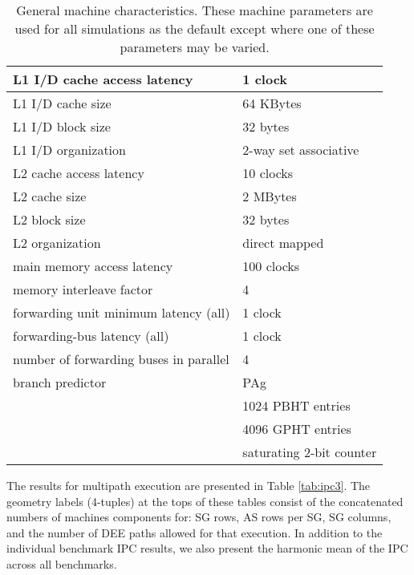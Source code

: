 \documentclass[10pt,twocolumn,dvips]{article}
\begin{document}
\begin{table*}
\scriptsize{
\begin{center}
\caption{General machine characteristics.
These machine parameters are used for all simulations as
the default except where one of these parameters may be varied.}
\label{tab:params}
\begin{tabular}{|l|l|}
\hline 
L1 I/D cache access latency&1 clock\\
\hline
L1 I/D cache size&64 KBytes\\
\hline
L1 I/D block size&32 bytes\\
\hline
L1 I/D organization&2-way set associative\\
\hline
L2 cache access latency&10 clocks\\
\hline
L2 cache size&2 MBytes\\
\hline
L2 block size&32 bytes\\
\hline
L2 organization&direct mapped\\
\hline
main memory access latency&100 clocks\\
\hline
memory interleave factor&4\\
\hline
forwarding unit minimum latency (all)&1 clock\\
\hline
forwarding-bus latency (all)&1 clock\\
\hline
number of forwarding buses in parallel&4\\
\hline
branch predictor&PAg\\
\cline{2-2}
 & 1024 PBHT entries\\
\cline{2-2}
 & 4096 GPHT entries\\
\cline{2-2}
 & saturating 2-bit counter\\
\hline
\end{tabular}
\end{center}
}
\end{table*}
%
The results for multipath execution are
presented in Table \ref{tab:ipc3}.
The geometry labels (4-tuples) 
at the tops of these tables consist of the concatenated 
numbers of
machines components for: SG rows, AS rows per SG, SG columns,
and the number of DEE paths allowed for that execution.
In addition to the individual benchmark IPC results, we also
present the harmonic mean of the IPC across all benchmarks.
%
%
\end{document}
